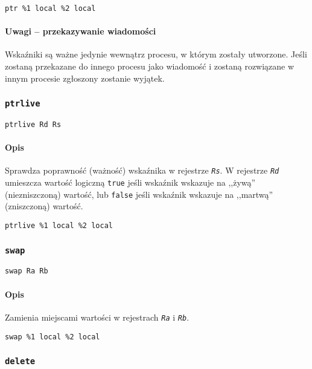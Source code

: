 \begin{lstlisting}
ptr %1 local %2 local
\end{lstlisting}

\paragraph*{Uwagi -- przekazywanie wiadomości} Wskaźniki są ważne jedynie
wewnątrz procesu, w którym zostały utworzone. Jeśli zostaną przekazane do innego
procesu jako wiadomość i zostaną rozwiązane w innym procesie zgłoszony zostanie
wyjątek.

\subsubsection{\texttt{ptrlive}}

\begin{lstlisting}
ptrlive Rd Rs
\end{lstlisting}

\paragraph*{Opis} Sprawdza poprawność (ważność) wskaźnika w rejestrze
\texttt{\emph{Rs}}. W rejestrze \texttt{\emph{Rd}} umieszcza wartość logiczną
\texttt{true} jeśli wskaźnik wskazuje na ,,żywą'' (niezniszczoną) wartość, lub
\texttt{false} jeśli wskaźnik wskazuje na ,,martwą'' (zniszczoną) wartość.

\begin{lstlisting}
ptrlive %1 local %2 local
\end{lstlisting}

\subsubsection{\texttt{swap}}

\begin{lstlisting}
swap Ra Rb
\end{lstlisting}

\paragraph*{Opis} Zamienia miejscami wartości w rejestrach \texttt{\emph{Ra}} i
\texttt{\emph{Rb}}.

\begin{lstlisting}
swap %1 local %2 local
\end{lstlisting}

\subsubsection{\texttt{delete}}

